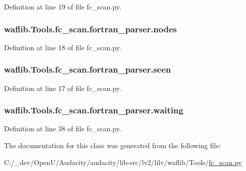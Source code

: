 Definition at line 19 of file fc\+\_\+scan.\+py.

\subsubsection[{\texorpdfstring{nodes}{nodes}}]{\setlength{\rightskip}{0pt plus 5cm}waflib.\+Tools.\+fc\+\_\+scan.\+fortran\+\_\+parser.\+nodes}\hypertarget{classwaflib_1_1_tools_1_1fc__scan_1_1fortran__parser_a628851d346134580bc01cdfb125e8215}{}\label{classwaflib_1_1_tools_1_1fc__scan_1_1fortran__parser_a628851d346134580bc01cdfb125e8215}


Definition at line 18 of file fc\+\_\+scan.\+py.

\subsubsection[{\texorpdfstring{seen}{seen}}]{\setlength{\rightskip}{0pt plus 5cm}waflib.\+Tools.\+fc\+\_\+scan.\+fortran\+\_\+parser.\+seen}\hypertarget{classwaflib_1_1_tools_1_1fc__scan_1_1fortran__parser_a06b3374315e709b61857ca36a23f089d}{}\label{classwaflib_1_1_tools_1_1fc__scan_1_1fortran__parser_a06b3374315e709b61857ca36a23f089d}


Definition at line 17 of file fc\+\_\+scan.\+py.

\subsubsection[{\texorpdfstring{waiting}{waiting}}]{\setlength{\rightskip}{0pt plus 5cm}waflib.\+Tools.\+fc\+\_\+scan.\+fortran\+\_\+parser.\+waiting}\hypertarget{classwaflib_1_1_tools_1_1fc__scan_1_1fortran__parser_ac6cc09b2284709cb3bca0de459e13588}{}\label{classwaflib_1_1_tools_1_1fc__scan_1_1fortran__parser_ac6cc09b2284709cb3bca0de459e13588}


Definition at line 38 of file fc\+\_\+scan.\+py.



The documentation for this class was generated from the following file\+:\begin{DoxyCompactItemize}
\item 
C\+:/\+\_\+dev/\+Open\+U/\+Audacity/audacity/lib-\/src/lv2/lilv/waflib/\+Tools/\hyperlink{lilv_2waflib_2_tools_2fc__scan_8py}{fc\+\_\+scan.\+py}\end{DoxyCompactItemize}
